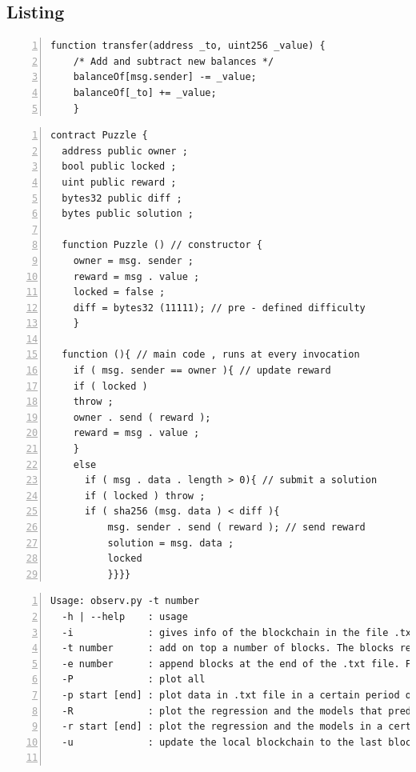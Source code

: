 \documentclass[USenglish]{uit-thesis}
\begin{document}
\begin{appendices}
	\chapter{Listing}
	\label{app:listing}
	\begin{lstlisting}[numbers=left,frame=single,caption={Smart contract transaction code in Ethereum.}]
function transfer(address _to, uint256 _value) {
	/* Add and subtract new balances */
	balanceOf[msg.sender] -= _value;
	balanceOf[_to] += _value;
	}
	\end{lstlisting}
	
\begin{lstlisting}[float, numbers=left,frame=single,caption={Example of a smart contract that rewards users who solve a computational puzzle~\cite{smartcontracts}.}]
contract Puzzle {
  address public owner ;
  bool public locked ;
  uint public reward ;
  bytes32 public diff ;
  bytes public solution ;

  function Puzzle () // constructor {
    owner = msg. sender ;
    reward = msg . value ;
    locked = false ;
    diff = bytes32 (11111); // pre - defined difficulty
    }

  function (){ // main code , runs at every invocation
    if ( msg. sender == owner ){ // update reward
    if ( locked )
    throw ;
    owner . send ( reward );
    reward = msg . value ;
    }
    else
      if ( msg . data . length > 0){ // submit a solution
      if ( locked ) throw ;
      if ( sha256 (msg. data ) < diff ){
          msg. sender . send ( reward ); // send reward
          solution = msg. data ;
          locked
          }}}}
\end{lstlisting}

\begin{lstlisting}[float, numbers=left, frame=single, caption={Application usage.}]
Usage: observ.py -t number
  -h | --help    : usage
  -i             : gives info of the blockchain in the file .txt
  -t number      : add on top a number of blocks. The blocks retreived will be the most recent ones. If the blockchain growth more than the block requested do -u (update)
  -e number      : append blocks at the end of the .txt file. Fetch older blocks starting from the last retrieved
  -P             : plot all
  -p start [end] : plot data in .txt file in a certain period of time, from start to end. If only start then consider from start to the end of the .txt file
  -R             : plot the regression and the models that predict the blockchain
  -r start [end] : plot the regression and the models in a certain period of time, from start to end. If only start then consider from start to the end of the .txt file
  -u             : update the local blockchain to the last block created


\end{lstlisting}
\end{appendices}
\end{document}
